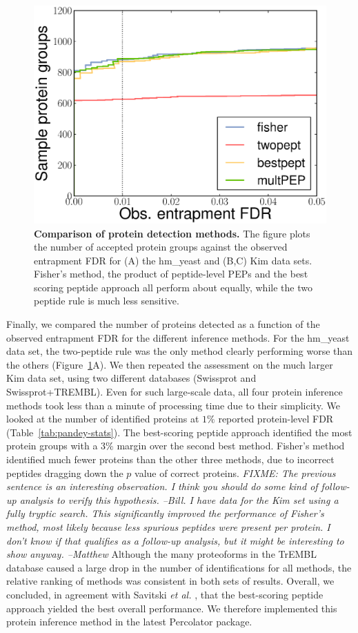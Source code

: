 \documentclass{article}
\begin{document}
\begin{figure}
  \centering
  \includegraphics[width=0.45\linewidth]{./img/unique-pept-performance}
  \caption{{\bf Comparison of protein detection methods.}  The figure
    plots the number of accepted protein groups against the observed
    entrapment FDR for (A) the hm\_yeast and (B,C) Kim data
    sets. Fisher's method, the product of peptide-level PEPs and the
    best scoring peptide approach all perform about equally, while the
    two peptide rule is much less sensitive.}
  \label{fig:power}
\end{figure}

Finally, we compared the number of proteins detected as a function of
the observed entrapment FDR for the different inference methods.  For
the hm\_yeast data set, the two-peptide rule was the only method
clearly performing worse than the others (Figure~\ref{fig:power}A).
We then repeated the assessment on the much larger Kim data set, using
two different databases (Swissprot and Swissprot+TREMBL).  Even for
such large-scale data, all four protein inference methods took less
than a minute of processing time due to their simplicity. We looked at
the number of identified proteins at $1\%$ reported protein-level FDR
(Table~\ref{tab:pandey-stats}).  The best-scoring peptide approach
identified the most protein groups with a $3\%$ margin over the second
best method. Fisher's method identified much fewer proteins than the
other three methods, due to incorrect peptides dragging down the $p$
value of correct proteins. {\em FIXME: The previous sentence is an
interesting observation. I think you should do some kind of follow-up
analysis to verify this hypothesis. --Bill. I have data for the Kim
set using a fully tryptic search. This significantly improved the
performance of Fisher's method, most likely because less spurious
peptides were present per protein. I don't know if that qualifies as a
follow-up analysis, but it might be interesting to show
anyway. --Matthew} Although the many proteoforms in the TrEMBL
  database caused a large drop in the number of identifications for
  all methods, the relative ranking of methods was consistent in both
  sets of results. Overall, we concluded, in agreement with Savitski
  {\em et al.}  \cite{savitski2015scalable}, that the best-scoring
  peptide approach yielded the best overall performance.  We therefore
  implemented this protein inference method in the latest Percolator
  package.
\end{document}
